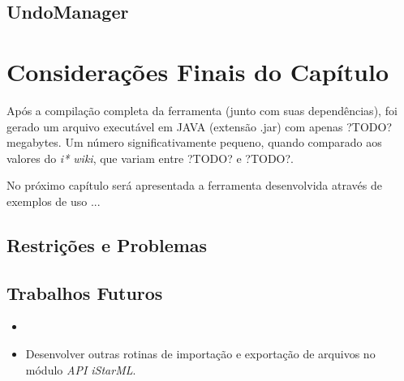         \subsection{UndoManager}

    \section{Considerações Finais do Capítulo}
        \label{cap:proposta-sec:consideracoes}

        Após a compilação completa da ferramenta (junto com suas dependências),
            foi gerado um arquivo executável em JAVA (extensão .jar) com apenas
            ?TODO? megabytes.
            Um número significativamente pequeno, quando comparado aos valores do \emph{i* wiki}, que variam entre ?TODO? e ?TODO?.

        No próximo capítulo será apresentada a ferramenta desenvolvida através de exemplos de uso ...
        
        \subsection{Restrições e Problemas}



        \subsection{Trabalhos Futuros}
            \begin{itemize}
                \item 
                \item Desenvolver outras rotinas de importação e exportação de arquivos no módulo \emph{API iStarML}.
            \end{itemize}


